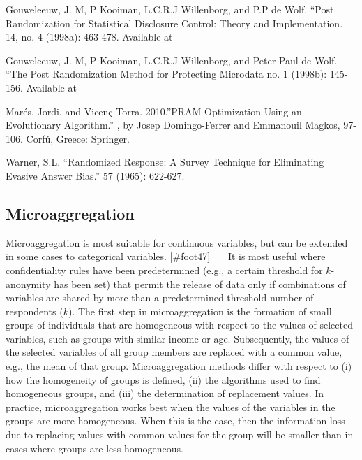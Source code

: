 \documentclass[letterpaper,10pt,english]{sphinxmanual}
\begin{document}
\begin{DUlineblock}{0em}
\item[] 
\item[] \sphinxcode{\sphinxupquote{\#\# - - - - - - - - - - -}}
\item[] 
\end{DUlineblock}


Gouweleeuw, J. M, P Kooiman, L.C.R.J Willenborg, and P.P de Wolf. “Post
Randomization for Statistical Disclosure Control: Theory and
Implementation. 14, no. 4 (1998a):
463-478. Available at

Gouweleeuw, J. M, P Kooiman, L.C.R.J Willenborg, and Peter Paul de Wolf.
“The Post Randomization Method for Protecting Microdata no. 1 (1998b):
145-156. Available at

Marés, Jordi, and Vicenç Torra. 2010.”PRAM Optimization Using an
Evolutionary Algorithm.” , by Josep
Domingo-Ferrer and Emmanouil Magkos, 97-106. Corfú, Greece: Springer.

Warner, S.L. “Randomized Response: A Survey Technique for Eliminating
Evasive Answer Bias.”  57
(1965): 622-627.


\subsection{Microaggregation}
\label{\detokenize{anon_methods:id14}}
Microaggregation is most suitable for continuous variables, but can be
extended in some cases to categorical variables. {[}\#foot47{]}\_\_
It is most useful where confidentiality rules have been predetermined
(e.g., a certain threshold for \(k\)-anonymity has been set) that
permit the release of data only if combinations of variables are shared
by more than a predetermined threshold number of respondents
(\(k\)). The first step in microaggregation is the formation of
small groups of individuals that are homogeneous with respect to the
values of selected variables, such as groups with similar income or age.
Subsequently, the values of the selected variables of all group members
are replaced with a common value, e.g., the mean of that group.
Microaggregation methods differ with respect to (i) how the homogeneity
of groups is defined, (ii) the algorithms used to find homogeneous
groups, and (iii) the determination of replacement values. In practice,
microaggregation works best when the values of the variables in the
groups are more homogeneous. When this is the case, then the information
loss due to replacing values with common values for the group will be
smaller than in cases where groups are less homogeneous.
\end{document}
